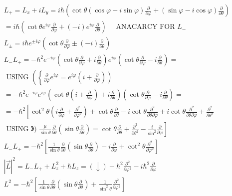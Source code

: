 \begin{align*}
& L_{+}=L_{x}+i L_{y}=i \hbar\left(\cot \theta(\cos \varphi+i \sin \varphi) \frac{\partial}{\partial \varphi}+(\sin \varphi-i \cos \varphi) \frac{\partial}{\partial \theta}\right) \\
& =i \hbar\left(\cot \theta e^{i \varphi} \frac{\partial}{\partial \varphi}+(-i) e^{i \varphi} \frac{\partial}{\partial \theta}\right) \quad \text { ANACARCY FOR } L_{-} \\
& L_{ \pm}=i \hbar e^{ \pm i \varphi}\left(\cot \theta \frac{\partial}{\partial \varphi} \pm(-i) \frac{\partial}{\partial \theta}\right) \\
& L_{-} L_{+}=-\hbar^{2} e^{-i \varphi}\left(\cot \theta \frac{\partial}{\partial \varphi}+i \frac{\partial}{\partial \theta}\right) e^{i \varphi}\left(\cot \theta \frac{\partial}{\partial \varphi}-i \frac{\partial}{\partial \theta}\right)= \\
& \text { USING }\left(\left\{\frac{\partial}{\partial \varphi} e^{i \varphi}=e^{i \varphi}\left(i+\frac{\partial}{\partial \varphi}\right)\right)\right. \\
& =-\hbar^{2} e^{-i \varphi} e^{i \varphi}\left(\cot \theta\left(i+\frac{\partial}{\partial \varphi}\right)+i \frac{\partial}{\partial \theta}\right)\left(\cot \theta \frac{\partial}{\partial \varphi}-i \frac{\partial}{\partial \theta}\right)= \\
& =-\hbar^{2}\left[\cot ^{2} \theta\left(i \frac{\partial}{\partial \varphi}+\frac{\partial^{2}}{\partial \varphi^{2}}\right)+\cot \theta \frac{\partial}{\partial \theta}-i \cot \theta \frac{\partial^{2}}{\partial \theta \partial \varphi}+i \cot \theta \frac{\partial^{2}}{\partial \theta \partial \varphi}+\frac{\partial^{2}}{\partial \theta^{2}}\right. \\
& \text { USING 》) } \left.\frac{\mu}{\sin \theta} \frac{\partial}{\partial \theta}\left(\sin \theta \frac{\partial}{\partial \theta}\right)=\cot \theta \frac{\partial}{\partial \theta}+\frac{\partial^{2}}{\partial \theta^{2}}-\frac{i}{\sin ^{2}} \frac{\partial}{\partial \varphi}\right] \\
& L_{-} L_{+}=-\hbar^{2}\left[\frac{1}{\sin \theta} \frac{\partial}{\partial \theta}\left(\sin \theta \frac{\partial}{\partial \theta}\right)-i \frac{\partial}{\partial \varphi}+\cot ^{2} \theta \frac{\partial^{2}}{\partial \varphi^{2}}\right] \\
& |\vec{L}|^{2}=L_{-} L_{+}+L_{z}^{2}+\hbar L_{z}=(\downarrow)-\hbar^{2} \frac{\partial^{2}}{\partial \varphi^{2}}-i \hbar^{2} \frac{\partial}{\partial \varphi} \\
& L^{2}=-\hbar^{2}\left[\frac{1}{\sin \theta} \frac{\partial}{\partial \theta}\left(\sin \theta \frac{\partial}{\partial \theta}\right)+\frac{1}{\sin ^{2} \theta} \frac{\partial^{2}}{\partial \varphi^{2}}\right] \tag{$\omega$}
\end{align*}


